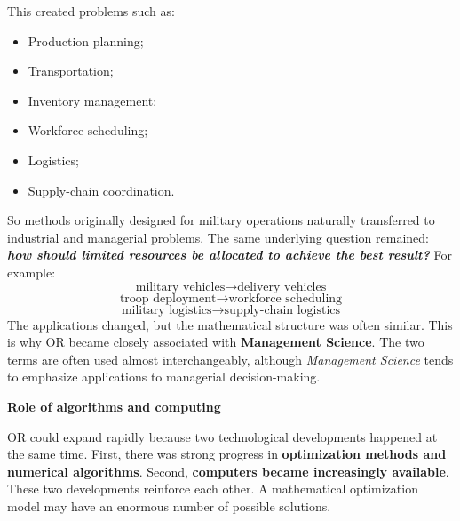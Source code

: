\highspace
This created problems such as:
\begin{itemize}
    \item Production planning;
    \item Transportation;
    \item Inventory management;
    \item Workforce scheduling;
    \item Logistics;
    \item Supply-chain coordination.
\end{itemize}
So methods originally designed for military operations naturally transferred to industrial and managerial problems. The same underlying question remained: \emph{\textbf{how should limited resources be allocated to achieve the best result?}} For example:
\begin{equation*}
    \text{military vehicles}
    \longrightarrow
    \text{delivery vehicles}
\end{equation*}
\begin{equation*}
    \text{troop deployment}
    \longrightarrow
    \text{workforce scheduling}
\end{equation*}
\begin{equation*}
    \text{military logistics}
    \longrightarrow
    \text{supply-chain logistics}
\end{equation*}
The applications changed, but the mathematical structure was often similar. This is why OR became closely associated with \textbf{Management Science}. The two terms are often used almost interchangeably, although \emph{Management Science} tends to emphasize applications to managerial decision-making.

\highspace
\begin{flushleft}
    \textcolor{Green3}{ \textbf{Role of algorithms and computing}}
\end{flushleft}
OR could expand rapidly because two technological developments happened at the same time. First, there was strong progress in \textbf{optimization methods and numerical algorithms}. Second, \textbf{computers became increasingly available}. These two developments reinforce each other. A mathematical optimization model may have an enormous number of possible solutions.

